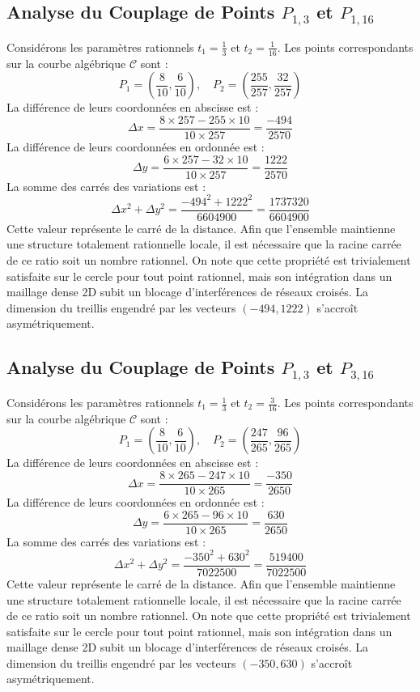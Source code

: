 \documentclass[12pt, a4paper]{article}
\begin{document}
\subsection{Analyse du Couplage de Points $P_{1,3}$ et $P_{1,16}$}
Considérons les paramètres rationnels $t_1 = \frac{1}{3}$ et $t_2 = \frac{1}{16}$.
Les points correspondants sur la courbe algébrique $\mathcal{C}$ sont :
$$ P_1 = \left( \frac{8}{10}, \frac{6}{10} \right), \quad P_2 = \left( \frac{255}{257}, \frac{32}{257} \right) $$
La différence de leurs coordonnées en abscisse est :
$$ \Delta x = \frac{8 \times 257 - 255 \times 10}{10 \times 257} = \frac{-494}{2570} $$
La différence de leurs coordonnées en ordonnée est :
$$ \Delta y = \frac{6 \times 257 - 32 \times 10}{10 \times 257} = \frac{1222}{2570} $$
La somme des carrés des variations est :
$$ \Delta x^2 + \Delta y^2 = \frac{ -494^2 + 1222^2 }{ 6604900 } = \frac{ 1737320 }{ 6604900 } $$
Cette valeur représente le carré de la distance. Afin que l'ensemble maintienne une structure totalement rationnelle locale, il est nécessaire que la racine carrée de ce ratio soit un nombre rationnel. On note que cette propriété est trivialement satisfaite sur le cercle pour tout point rationnel, mais son intégration dans un maillage dense 2D subit un blocage d'interférences de réseaux croisés. La dimension du treillis engendré par les vecteurs $( -494, 1222 )$ s'accroît asymétriquement.


\subsection{Analyse du Couplage de Points $P_{1,3}$ et $P_{3,16}$}
Considérons les paramètres rationnels $t_1 = \frac{1}{3}$ et $t_2 = \frac{3}{16}$.
Les points correspondants sur la courbe algébrique $\mathcal{C}$ sont :
$$ P_1 = \left( \frac{8}{10}, \frac{6}{10} \right), \quad P_2 = \left( \frac{247}{265}, \frac{96}{265} \right) $$
La différence de leurs coordonnées en abscisse est :
$$ \Delta x = \frac{8 \times 265 - 247 \times 10}{10 \times 265} = \frac{-350}{2650} $$
La différence de leurs coordonnées en ordonnée est :
$$ \Delta y = \frac{6 \times 265 - 96 \times 10}{10 \times 265} = \frac{630}{2650} $$
La somme des carrés des variations est :
$$ \Delta x^2 + \Delta y^2 = \frac{ -350^2 + 630^2 }{ 7022500 } = \frac{ 519400 }{ 7022500 } $$
Cette valeur représente le carré de la distance. Afin que l'ensemble maintienne une structure totalement rationnelle locale, il est nécessaire que la racine carrée de ce ratio soit un nombre rationnel. On note que cette propriété est trivialement satisfaite sur le cercle pour tout point rationnel, mais son intégration dans un maillage dense 2D subit un blocage d'interférences de réseaux croisés. La dimension du treillis engendré par les vecteurs $( -350, 630 )$ s'accroît asymétriquement.
\end{document}
